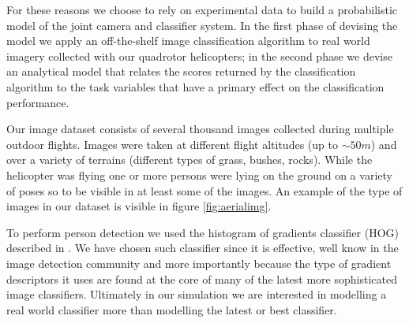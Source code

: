 \documentclass[a4paper,11pt]{report}
\begin{document}
For these reasons we choose to rely on experimental data to build a probabilistic model of the joint camera and classifier system. In the first phase of devising the model we apply an off-the-shelf image classification algorithm to real world imagery collected with our quadrotor helicopters; in the second phase we devise an analytical model that relates the scores returned by the classification algorithm to the task variables that have a primary effect on the classification performance.   

Our image dataset consists of several thousand images collected during multiple outdoor flights. Images were taken at different flight altitudes (up to $\sim50m$) and over a variety of terrains (different types of grass, bushes, rocks). While the helicopter was flying one or more persons were lying on the ground on a variety of poses so to be visible in at least some of the images. An example of the type of images in our dataset is visible in figure \ref{fig:aerialimg}. 

To perform person detection we used the histogram of gradients classifier (HOG) described in \cite{dalal2005}. 
We have chosen such classifier since it is effective, well know in the image detection community and more importantly because the type of gradient descriptors it uses are found at the core of many of the latest more sophisticated image classifiers. Ultimately in our simulation we are interested in modelling a real world classifier more than modelling the latest or best classifier. 
\end{document}
